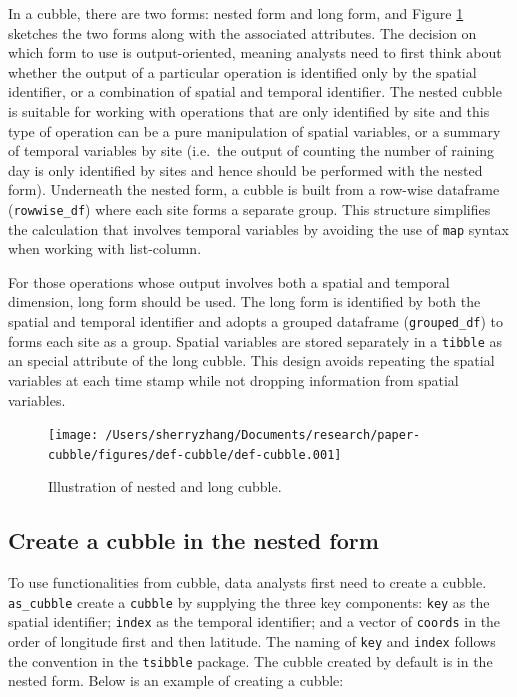 \documentclass[
]{jss}
\begin{document}
In a cubble, there are two forms: nested form and long form, and Figure
\ref{fig:def-cubble} sketches the two forms along with the associated
attributes. The decision on which form to use is output-oriented,
meaning analysts need to first think about whether the output of a
particular operation is identified only by the spatial identifier, or a
combination of spatial and temporal identifier. The nested cubble is
suitable for working with operations that are only identified by site
and this type of operation can be a pure manipulation of spatial
variables, or a summary of temporal variables by site (i.e.~the output
of counting the number of raining day is only identified by sites and
hence should be performed with the nested form). Underneath the nested
form, a cubble is built from a row-wise dataframe (\texttt{rowwise\_df})
where each site forms a separate group. This structure simplifies the
calculation that involves temporal variables by avoiding the use of
\texttt{map} syntax when working with list-column.

For those operations whose output involves both a spatial and temporal
dimension, long form should be used. The long form is identified by both
the spatial and temporal identifier and adopts a grouped dataframe
(\texttt{grouped\_df}) to forms each site as a group. Spatial variables
are stored separately in a \texttt{tibble} as an special attribute of
the long cubble. This design avoids repeating the spatial variables at
each time stamp while not dropping information from spatial variables.

\begin{CodeChunk}
\begin{figure}

{\centering \texttt{[image: /Users/sherryzhang/Documents/research/paper-cubble/figures/def-cubble/def-cubble.001]} 

}

\caption[Illustration of nested and long cubble]{Illustration of nested and long cubble.}\label{fig:def-cubble}
\end{figure}
\end{CodeChunk}

\hypertarget{create-a-cubble-in-the-nested-form}{%
\subsection{Create a cubble in the nested
form}\label{create-a-cubble-in-the-nested-form}}

To use functionalities from cubble, data analysts first need to create a
cubble. \texttt{as\_cubble} create a \texttt{cubble} by supplying the
three key components: \texttt{key} as the spatial identifier;
\texttt{index} as the temporal identifier; and a vector of
\texttt{coords} in the order of longitude first and then latitude. The
naming of \texttt{key} and \texttt{index} follows the convention in the
\texttt{tsibble} package. The cubble created by default is in the nested
form. Below is an example of creating a cubble: \newline
\end{document}
